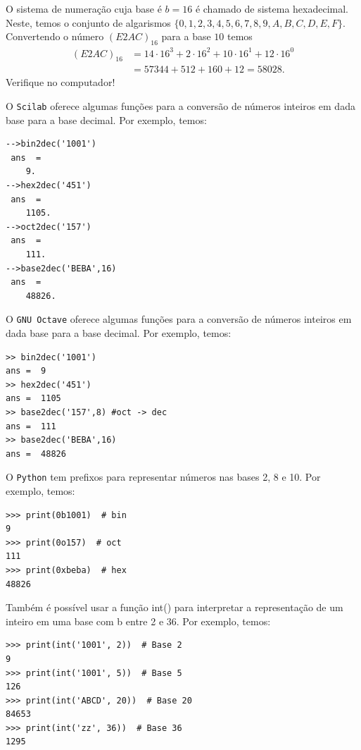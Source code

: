 \begin{ex} O sistema de numeração cuja base é $b=16$ é chamado de sistema hexadecimal. Neste, temos o conjunto de algarismos $\{0, 1, 2, 3, 4, 5, 6, 7, 8, 9, A, B, C, D, E, F\}$. Convertendo o número $(E2AC)_{16}$ para a base $10$ temos
\begin{equation}
  \begin{split}
  (E2AC)_{16} &= 14\cdot 16^3+2\cdot 16^2+10\cdot 16^1+12\cdot 16^{0}\\
  &=57344+512+160+12=58028.
  \end{split}
\end{equation}
Verifique no computador!
\end{ex}

\ifisscilab
\begin{obs}
  O \verb+Scilab+ oferece algumas funções para a conversão de números inteiros em dada base para a base decimal. Por exemplo, temos:
\begin{verbatim}
-->bin2dec('1001')
 ans  =
    9.
-->hex2dec('451')
 ans  =
    1105.
-->oct2dec('157')
 ans  =
    111.
-->base2dec('BEBA',16)
 ans  =
    48826.
\end{verbatim}
\end{obs}
\fi
\ifisoctave
\begin{obs}
  O \verb+GNU Octave+ oferece algumas funções para a conversão de números inteiros em dada base para a base decimal. Por exemplo, temos:
\begin{verbatim}
>> bin2dec('1001')
ans =  9
>> hex2dec('451')
ans =  1105
>> base2dec('157',8) #oct -> dec
ans =  111
>> base2dec('BEBA',16)
ans =  48826
\end{verbatim}
\end{obs}
\fi
\ifispython
\begin{obs}
  O \verb+Python+ tem prefixos para representar números nas bases 2, 8 e 10. Por exemplo, temos:
\begin{verbatim}
>>> print(0b1001)  # bin
9
>>> print(0o157)  # oct
111
>>> print(0xbeba)  # hex
48826
\end{verbatim}
Também é possível usar a função int() para interpretar a representação de um inteiro em uma base com b entre 2 e 36. Por exemplo, temos:
\begin{verbatim}
>>> print(int('1001', 2))  # Base 2
9
>>> print(int('1001', 5))  # Base 5
126
>>> print(int('ABCD', 20))  # Base 20
84653
>>> print(int('zz', 36))  # Base 36
1295
\end{verbatim}
\end{obs}
\fi

